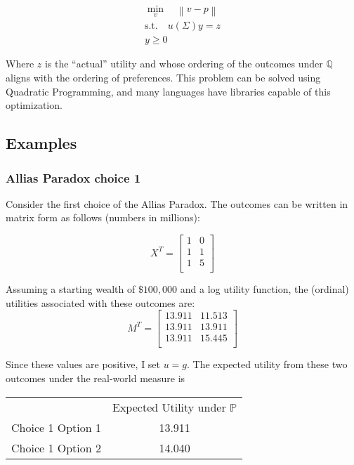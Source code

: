 \documentclass{article}
\newcommand{\norm}[1]{\left\lVert#1\right\rVert}
\begin{document}
\begin{equation}
\begin{aligned}
\min_v \quad \norm{v-p} \\
\textrm{s.t.}\quad u(\Sigma) y = z\\
y \geq 0
\end{aligned}
\end{equation}

Where \(z\) is the ``actual'' utility and whose ordering of the outcomes under \(\mathbb{Q}\) aligns with the ordering of preferences.  This problem can be solved using Quadratic Programming, and many languages have libraries capable of this optimization. 

\subsection{Examples}

\subsubsection{Allias Paradox choice 1}
Consider the first choice of the Allias Paradox.  The outcomes can be written in matrix form as follows (numbers in millions):

\[X^T=\begin{bmatrix}
	1 & 0  \\
	1 & 1  \\
	1 & 5  \\
\end{bmatrix}\]

Assuming a starting wealth of \(\$100,000\) and a log utility function, the (ordinal) utilities associated with these outcomes are:
\[M^T=\begin{bmatrix}
	13.911 & 11.513  \\
	13.911 & 13.911  \\
	13.911 & 15.445  \\
\end{bmatrix}\]

Since these values are positive, I set \(u=g\).  The expected utility from these two outcomes under the real-world measure is 

\begin{center} 
	\begin{tabular}{c c}
		& Expected Utility under \(\mathbb{P}\) \\
		Choice 1 Option 1 & 13.911 \\
		Choice 1 Option 2 & 14.040 \\
	\end{tabular}
\end{center}
\end{document}
